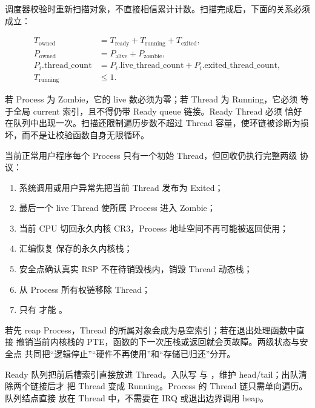 调度器校验时重新扫描对象，不直接相信累计计数。扫描完成后，下面的关系必须
成立：

\[
\begin{aligned}
T_{\mathrm{owned}} &=
T_{\mathrm{ready}}+T_{\mathrm{running}}+
T_{\mathrm{exited}},\\
P_{\mathrm{owned}} &=P_{\mathrm{alive}}+P_{\mathrm{zombie}},\\
P_i.\mathrm{thread\_count} &=
P_i.\mathrm{live\_thread\_count}+
P_i.\mathrm{exited\_thread\_count},\\
T_{\mathrm{running}} &\le 1.
\end{aligned}
\]

若 Process 为 Zombie，它的 live 数必须为零；若 Thread 为 Running，它必须
等于全局 current 索引，且不得仍带 Ready queue 链接。Ready Thread 必须
恰好在队列中出现一次。扫描还限制遍历步数不超过 Thread
容量，使环链被诊断为损坏，而不是让校验函数自身无限循环。

当前正常用户程序每个 Process 只有一个初始 Thread，但回收仍执行完整两级
协议：

\begin{enumerate}[label=\arabic*.]
  \item 系统调用或用户异常先把当前 Thread 发布为 Exited；
  \item 最后一个 live Thread 使所属 Process 进入 Zombie；
  \item 当前 CPU 切回永久内核 CR3，Process 地址空间不再可能被返回使用；
  \item 汇编恢复  保存的永久内核栈；
  \item 安全点确认真实 RSP 不在待销毁栈内，销毁 Thread 动态栈；
  \item {} 从 Process 所有权链移除 Thread；
  \item 只有  才能 。
\end{enumerate}

若先 reap Process，Thread 的所属对象会成为悬空索引；若在退出处理函数中直接
撤销当前内核栈的 PTE，函数的下一次压栈或返回就会页故障。两级状态与安全点
共同把“逻辑停止”“硬件不再使用”和“存储已归还”分开。

Ready 队列把前后槽索引直接放进 Thread。入队写
 与
，维护 head/tail；出队清除两个链接后才
把 Thread 变成 Running。Process 的 Thread 链只需单向遍历。队列结点直接
放在 Thread 中，不需要在 IRQ 或退出边界调用 heap。

